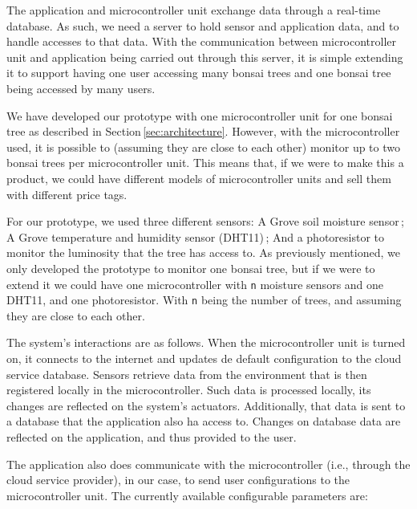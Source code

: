 \documentclass{article}
\begin{document}
The application and microcontroller unit exchange data through a real-time
database. As such, we need a server to hold sensor and application data, and to
handle accesses to that data. With the communication between microcontroller
unit and application being carried out through this server, it is simple
extending it to support having one user accessing many bonsai trees and one
bonsai tree being accessed by many users.

We have developed our prototype with one microcontroller unit for one bonsai
tree as described in Section\,\ref{sec:architecture}. However, with the
microcontroller used, it is possible to (assuming they are close to each other)
monitor up to two bonsai trees per microcontroller unit. This means that, if we
were to make this a product, we could have different models of microcontroller
units and sell them with different price tags.

For our prototype, we used three different sensors: A Grove soil moisture
sensor\,\cite{sensor_moisture}; A Grove temperature and humidity sensor
(DHT11)\,\cite{sensor_dht11}; And a photoresistor to monitor the luminosity that
the tree has access to. As previously mentioned, we only developed the prototype
to monitor one bonsai tree, but if we were to extend it we could have one
microcontroller with \texttt{n} moisture sensors and one DHT11, and one
photoresistor. With \texttt{n} being the number of trees, and assuming they are
close to each other.

The system's interactions are as follows. When the microcontroller unit is
turned on, it connects to the internet and updates de default configuration to
the cloud service database. Sensors retrieve data from the environment that is
then registered locally in the microcontroller. Such data is processed locally,
its changes are reflected on the system's actuators. Additionally, that data is
sent to a database that the application also ha access to. Changes on database
data are reflected on the application, and thus provided to the user.

The application also does communicate with the microcontroller (i.e., through
the cloud service provider), in our case, to send user configurations to the
microcontroller unit. The currently available configurable parameters are: 
\end{document}
